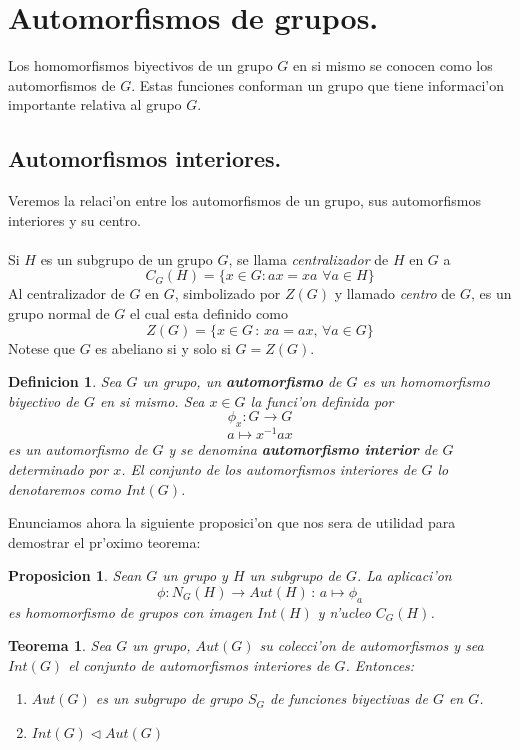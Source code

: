 \documentclass[a4paper,openright,12pt]{report}
\numberwithin{equation}{section} %
\newtheorem{teorema}{Teorema}[section] %
\newtheorem{proposicion}{Proposicion}[section] %
\newtheorem{definicion}{Definicion}[section] %
\begin{document}
\section{Automorfismos de grupos.}
Los homomorfismos biyectivos de un grupo $G$ en si mismo se conocen como los automorfismos de $G$. Estas funciones conforman un grupo que tiene informaci'on importante relativa al grupo $G$.
\subsection{Automorfismos interiores.}
Veremos la relaci'on entre los automorfismos de un grupo, sus automorfismos interiores y su centro.\\
\\
Si $H$ es un subgrupo de un grupo $G$, se llama \textit{centralizador} de $H$ en $G$ a
\[
C_{G}(H)=\{ x \in G : ax = xa \,\, \forall a \in H \}
\]
Al centralizador de $G$ en $G$, simbolizado por $Z(G)$ y llamado \textit{centro} de $G$, es un grupo normal de $G$ el cual esta definido como
\[
Z(G)=\{ x \in G\, : \, xa=ax, \, \forall a \in G \}
\] 
Notese que $G$ es abeliano si y solo si $G=Z(G)$.
\begin{definicion}
Sea $G$ un grupo, un \textbf{automorfismo} de $G$ es un homomorfismo biyectivo de $G$ en si mismo. Sea $x \in G$ la funci'on definida por
\[
\phi_{x}:G \rightarrow G
\]
\[
a \mapsto x^{-1}ax
\]
es un automorfismo de $G$ y se denomina \textbf{automorfismo interior} de $G$ determinado por $x$. El conjunto de los automorfismos interiores de $G$ lo denotaremos como $Int(G)$.
\end{definicion}
Enunciamos ahora la siguiente proposici'on que nos sera de utilidad para demostrar el pr'oximo teorema:
\begin{proposicion}
Sean $G$ un grupo y $H$ un subgrupo de $G$. La aplicaci'on 
\[
\phi : N_{G}(H) \rightarrow Aut(H) \, : \, a \mapsto \phi_{a}
\]
es homomorfismo de grupos con imagen $Int(H)$ y n'ucleo $C_{G}(H)$.
\end{proposicion}
\begin{teorema}
Sea $G$ un grupo, $Aut(G)$ su colecci'on de automorfismos y sea $Int(G)$ el conjunto de automorfismos interiores de $G$. Entonces:
\begin{enumerate}
\item $Aut(G)$ es un subgrupo de grupo $S_{G}$ de funciones biyectivas de $G$ en $G$.
\item $Int(G) \triangleleft Aut(G)$
\end{enumerate}
\end{teorema}
\end{document}
